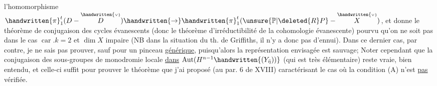 l'homomorphisme $\handwritten{\pi}_1^t(D-\overset{\handwritten{\scriptscriptstyle\vee}}{D})\handwritten{\rightarrow}\handwritten{\pi}_1^t(\unsure{\mathbb{P}|\deleted{R}P}-\overset{\handwritten{\scriptscriptstyle\vee}}{X})$, et donne le théorème de conjugaison des cycles évanescents (donc le théorème d'irréductibilité de la cohomologie évanescente) pourvu qu'on ne soit pas dans le cas $\operatorname{car}.k=2$ et $\dim X$ impaire (NB  dans la situation du th. de Griffiths, il n'y a donc pas d'ennui). Dans ce dernier cas, par contre, je ne sais  pas prouver, sauf pour un pinceau \uline{générique}, puisqu'alors la représentation envisagée est sauvage;  Noter cependant que la conjugaison des sous-groupes de monodromie locale \uline{dans} $\operatorname{Aut}(H^{n-1}\handwritten{(Y_{\bar{\eta}}))}$ (qui est très élémentaire) reste vraie, bien entendu, et celle-ci suffit pour prouver le théorème que j'ai proposé (au par. 6 de XVIII) caractérisant le cas où la condition (A) n'est \uline{pas} vérifiée.
